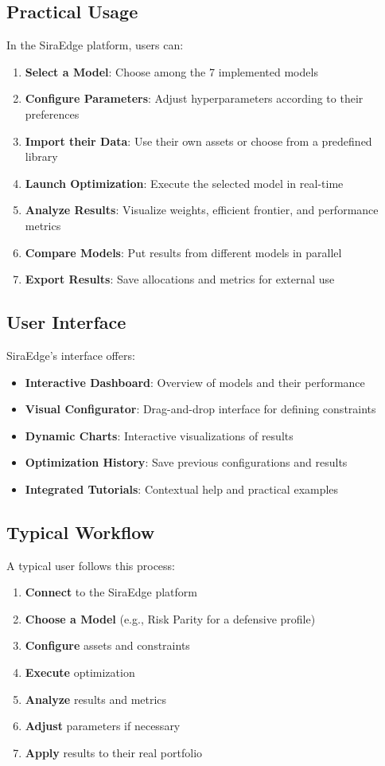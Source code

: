 \documentclass[11pt,a4paper]{article}
\begin{document}
\subsection{Practical Usage}
In the SiraEdge platform, users can:

\begin{enumerate}
\item \textbf{Select a Model}: Choose among the 7 implemented models
\item \textbf{Configure Parameters}: Adjust hyperparameters according to their preferences
\item \textbf{Import their Data}: Use their own assets or choose from a predefined library
\item \textbf{Launch Optimization}: Execute the selected model in real-time
\item \textbf{Analyze Results}: Visualize weights, efficient frontier, and performance metrics
\item \textbf{Compare Models}: Put results from different models in parallel
\item \textbf{Export Results}: Save allocations and metrics for external use
\end{enumerate}

\subsection{User Interface}
SiraEdge's interface offers:

\begin{itemize}
\item \textbf{Interactive Dashboard}: Overview of models and their performance
\item \textbf{Visual Configurator}: Drag-and-drop interface for defining constraints
\item \textbf{Dynamic Charts}: Interactive visualizations of results
\item \textbf{Optimization History}: Save previous configurations and results
\item \textbf{Integrated Tutorials}: Contextual help and practical examples
\end{itemize}

\subsection{Typical Workflow}
A typical user follows this process:

\begin{enumerate}
\item \textbf{Connect} to the SiraEdge platform
\item \textbf{Choose a Model} (e.g., Risk Parity for a defensive profile)
\item \textbf{Configure} assets and constraints
\item \textbf{Execute} optimization
\item \textbf{Analyze} results and metrics
\item \textbf{Adjust} parameters if necessary
\item \textbf{Apply} results to their real portfolio
\end{enumerate}
\end{document}
